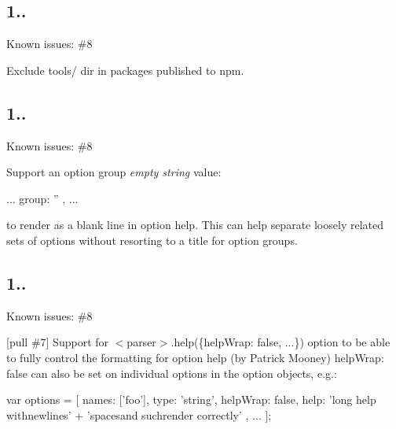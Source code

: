 \subsection*{1..}


\begin{DoxyItemize}
\item Known issues\+: \#8
\item Exclude \textquotesingle{}tools/\textquotesingle{} dir in packages published to npm.
\end{DoxyItemize}

\subsection*{1..}


\begin{DoxyItemize}
\item Known issues\+: \#8
\item Support an option group {\itshape empty string} value\+: \begin{DoxyVerb}  ...
  { group: '' },
  ...
\end{DoxyVerb}


to render as a blank line in option help. This can help separate loosely related sets of options without resorting to a title for option groups.
\end{DoxyItemize}

\subsection*{1..}


\begin{DoxyItemize}
\item Known issues\+: \#8
\item \mbox{[}pull \#7\mbox{]} Support for {\ttfamily $<$parser$>$.help(\{help\+Wrap\+: false, ...\})} option to be able to fully control the formatting for option help (by Patrick Mooney) {\ttfamily help\+Wrap\+: false} can also be set on individual options in the option objects, e.\+g.\+: \begin{DoxyVerb}  var options = [
      {
        names: ['foo'],
        type: 'string',
        helpWrap: false,
        help: 'long help with\n  newlines' +
          '\n  spaces\n  and such\nwill render correctly'
      },
      ...
  ];
\end{DoxyVerb}

\end{DoxyItemize}

